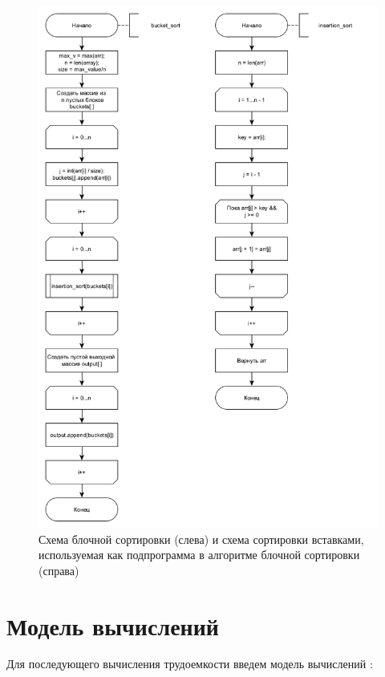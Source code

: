 \begin{figure}[h]
	\centering
	\includegraphics[scale = 0.45]{img/bucket_diag.png}
	\caption{Схема блочной сортировки (слева) и схема сортировки вставками, используемая как подпрограмма в алгоритме блочной сортировки (справа)}
	\label{fig:bucket_d}
\end{figure}
\clearpage
\section{Модель вычислений}

Для последующего вычисления трудоемкости введем модель вычислений \cite{model}:

